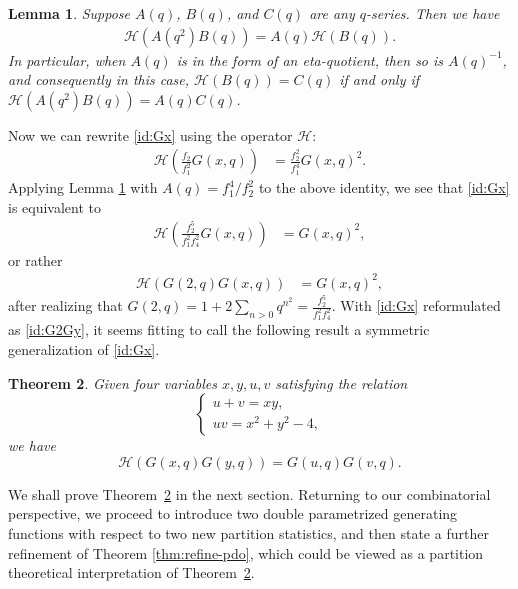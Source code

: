 \documentclass[11pt,reqno]{amsart}
\numberwithin{equation}{section}
\theoremstyle{plain}
\newtheorem{theorem}{Theorem}[section]
\newtheorem{lemma}[theorem]{Lemma}
\theoremstyle{definition}
\theoremstyle{named}
\def\cH{\mathcal{H}}
\begin{document}
\begin{lemma}\label{lem:gen lemma}
Suppose $A(q)$, $B(q)$, and $C(q)$ are any $q$-series. Then we have
\begin{align*}
\cH(A(q^2)B(q))=A(q)\cH(B(q)).
\end{align*} 
In particular, when $A(q)$ is in the form of an eta-quotient, then so is $A(q)^{-1}$, and consequently in this case, $\cH(B(q))=C(q)$ if and only if $\cH(A(q^2)B(q))=A(q)C(q)$.
\end{lemma}
Now we can rewrite \eqref{id:Gx} using the operator $\cH$:
\begin{align*}
\cH\left(\frac{f_2}{f_1^2}G(x,q)\right) &= \frac{f_2^2}{f_1^4}G(x,q)^2.
\end{align*}
Applying Lemma \ref{lem:gen lemma} with $A(q)=f_1^4/f_2^2$ to the above identity, we see that \eqref{id:Gx} is equivalent to 
\begin{align*}
\cH\left(\frac{f_2^5}{f_1^2f_4^2}G(x,q)\right) &= G(x,q)^2,
\end{align*}
or rather
\begin{align}\label{id:G2Gy}
\cH(G(2,q)G(x,q)) &= G(x,q)^2,
\end{align}
after realizing that $G(2,q)=1+2\sum_{n>0}q^{n^2}=\frac{f_2^5}{f_1^2f_4^2}$. With \eqref{id:Gx} reformulated as \eqref{id:G2Gy}, it seems fitting to call the following result a symmetric generalization of \eqref{id:Gx}.

\begin{theorem}\label{thm:GxGy}
Given four variables $x,y,u,v$ satisfying the relation
\begin{equation}\label{correlation}
\begin{cases}
u+v=xy,\\
uv=x^2+y^2-4,
\end{cases}
\end{equation}
we have
\begin{equation}\label{id:GxGy}
\cH(G(x,q)G(y,q))=G(u,q)G(v,q).
\end{equation}
\end{theorem}

We shall prove Theorem~\ref{thm:GxGy} in the next section. Returning to our combinatorial perspective, we proceed to introduce two double parametrized generating functions with respect to two new partition statistics, and then state a further refinement of Theorem \ref{thm:refine-pdo}, which could be viewed as a partition theoretical interpretation of Theorem~\ref{thm:GxGy}.
\end{document}
